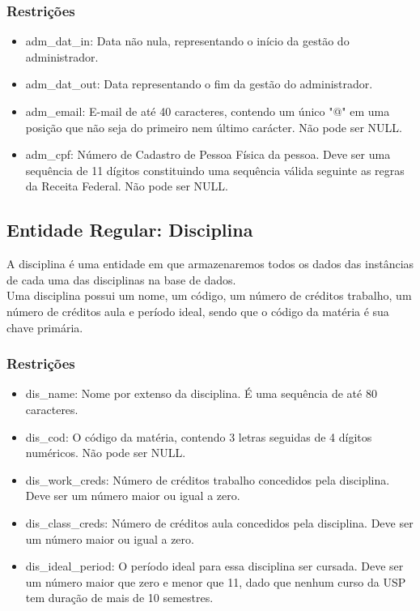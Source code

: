 \documentclass{article}
\begin{document}
        \subsubsection{Restrições}
            \begin{itemize}
                \item adm\_dat\_in: Data não nula, representando o início da gestão do administrador.
                \item adm\_dat\_out: Data representando o fim da gestão do administrador.
                \item adm\_email: E-mail de até 40 caracteres, contendo um único "@" em uma posição que não seja do primeiro nem último carácter. Não pode ser NULL.
                \item adm\_cpf: Número de Cadastro de Pessoa Física da pessoa. Deve ser uma sequência de 11 dígitos constituindo uma sequência válida seguinte as regras da Receita Federal. Não pode ser NULL.
            \end{itemize}
            
    \subsection{Entidade Regular: Disciplina}
        \quad A disciplina é uma entidade em que armazenaremos todos os dados das instâncias de cada uma das disciplinas na base de dados. \\
        \quad Uma disciplina possui um nome, um código, um número de créditos trabalho, um número de créditos aula e período ideal, sendo que o código da matéria é sua chave primária.
        \subsubsection{Restrições}
            \begin{itemize}
              \item dis\_name: Nome por extenso da disciplina. É uma sequência de até 80 caracteres.
              \item dis\_cod: O código da matéria, contendo 3 letras seguidas de 4 dígitos numéricos. Não pode ser NULL.
              \item dis\_work\_creds: Número de créditos trabalho concedidos pela disciplina. Deve ser um número maior ou igual a zero.
              \item dis\_class\_creds: Número de créditos aula concedidos pela disciplina. Deve ser um número maior ou igual a zero.
              \item dis\_ideal\_period: O período ideal para essa disciplina ser cursada. Deve ser um número maior que zero e menor que 11, dado que nenhum curso da USP tem duração de mais de 10 semestres.
          \end{itemize}
          
\end{document}
